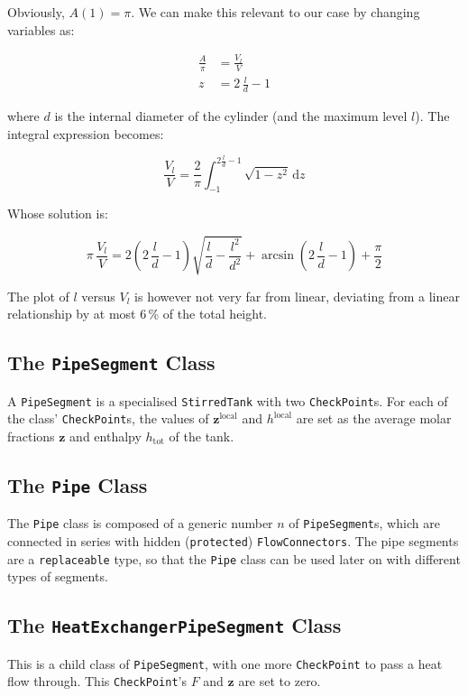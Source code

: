 \documentclass[a4paper]{article}
\renewcommand{\d}{\ensuremath{\mathrm{d}}}
\begin{document}
Obviously, $A(1) = \pi$. We can make this relevant to our case by changing
variables as:

\begin{align}
\frac{A}{\pi} &= \frac{V_l}{V}\\
z &= 2\,\frac{l}{d}-1
\end{align}

where $d$ is the internal diameter of the cylinder (and the maximum level $l$).
The integral expression becomes:

\begin{equation}
\frac{V_l}{V} = \frac{2}{\pi} \int_{-1}^{2\frac{l}{d}-1} \sqrt{1-z^2} \, \d z
\end{equation}

Whose solution is:

\begin{equation}
\pi \, \frac{V_l}{V} = 2 \left(2\,\frac{l}{d} -1 \right)\sqrt{\frac{l}{d}-
\frac{l^2}{d^2}} + \arcsin\left(2\,\frac{l}{d} -1 \right) + \frac{\pi}{2}
\end{equation}

The plot of $l$ versus $V_l$ is however not very far from linear, deviating from
a linear relationship by at most 6\,\% of the total height.


\subsection{The \texttt{PipeSegment} Class}
A \texttt{PipeSegment} is a specialised \texttt{StirredTank} with two
\texttt{CheckPoint}s. For each of the class' \texttt{CheckPoint}s, the values
of $\mathbf{z}^\text{local}$ and $h^\text{local}$ are set as the average molar
fractions $\mathbf{z}$ and enthalpy $h_\text{tot}$ of the tank.


\subsection{The \texttt{Pipe} Class}
The \texttt{Pipe} class is composed of a generic number $n$ of
\texttt{PipeSegment}s, which are connected in series with hidden
(\texttt{protected}) \texttt{FlowConnectors}. The pipe segments are a
\texttt{replaceable} type, so that the \texttt{Pipe} class can be used later on
with different types of segments.


\subsection{The \texttt{HeatExchangerPipeSegment} Class}
This is a child class of \texttt{PipeSegment}, with one more \texttt{CheckPoint}
to pass a heat flow through. This \texttt{CheckPoint}'s $F$ and $\mathbf{z}$ are
set to zero.
\end{document}
